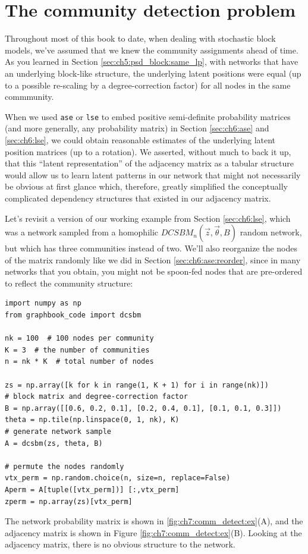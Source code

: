 \section{The community detection problem}
\label{sec:ch7:comm_detect}

Throughout most of this book to date, when dealing with stochastic block models, we've assumed that we knew the community assignments ahead of time. As you learned in Section \ref{sec:ch5:psd_block:same_lp}, with networks that have an underlying block-like structure, the underlying latent positions were equal (up to a possible re-scaling by a degree-correction factor) for all nodes in the same commmunity.

When we used \texttt{ase} or \texttt{lse} to embed positive semi-definite probability matrices (and more generally, any probability matrix) in Section \ref{sec:ch6:ase} and \ref{sec:ch6:lse}, we could obtain reasonable estimates of the underlying latent position matrices (up to a rotation). We asserted, without much to back it up, that this ``latent representation'' of the adjacency matrix as a tabular structure would allow us to learn latent patterns in our network that might not necessarily be obvious at first glance which, therefore, greatly simplified the conceptually complicated dependency structures that existed in our adjacency matrix. 

Let's revisit a version of our working example from Section \ref{sec:ch6:lse}, which was a network sampled from a homophilic $DCSBM_n(\vec z, \vec\theta, B)$ random network, but which has three communities instead of two. We'll also reorganize the nodes of the matrix randomly like we did in Section \ref{sec:ch6:ase:reorder}, since in many networks that you obtain, you might not be spoon-fed nodes that are pre-ordered to reflect the community structure:

\begin{lstlisting}[style=python]
import numpy as np
from graphbook_code import dcsbm

nk = 100  # 100 nodes per community
K = 3  # the number of communities
n = nk * K  # total number of nodes

zs = np.array([k for k in range(1, K + 1) for i in range(nk)])
# block matrix and degree-correction factor
B = np.array([[0.6, 0.2, 0.1], [0.2, 0.4, 0.1], [0.1, 0.1, 0.3]])
theta = np.tile(np.linspace(0, 1, nk), K)
# generate network sample
A = dcsbm(zs, theta, B)

# permute the nodes randomly
vtx_perm = np.random.choice(n, size=n, replace=False)
Aperm = A[tuple([vtx_perm])] [:,vtx_perm]
zperm = np.array(zs)[vtx_perm]
\end{lstlisting}
The network probability matrix is shown in \ref{fig:ch7:comm_detect:ex}(A), and the adjacency matrix is shown in Figure \ref{fig:ch7:comm_detect:ex}(B). Looking at the adjacency matrix, there is no obvious structure to the network.

